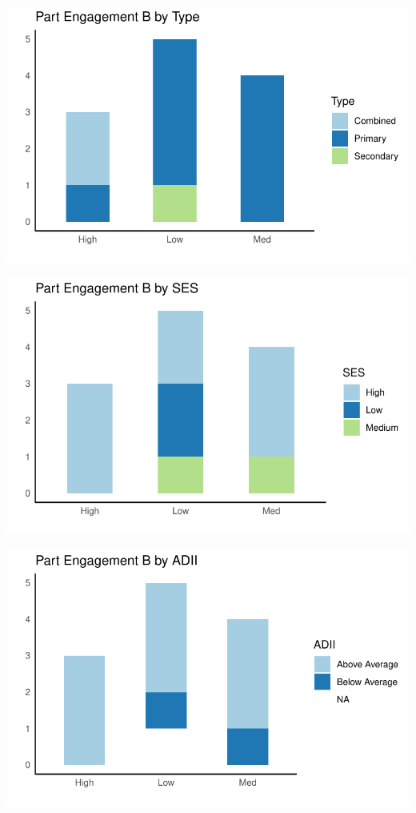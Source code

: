 \documentclass[
  letterpaper,
  DIV=11,
  numbers=noendperiod]{scrartcl}
\begin{document}
\includegraphics{report_files/figure-pdf/unnamed-chunk-19-9.pdf}

\includegraphics{report_files/figure-pdf/unnamed-chunk-19-10.pdf}

\includegraphics{report_files/figure-pdf/unnamed-chunk-19-11.pdf}
\end{document}
